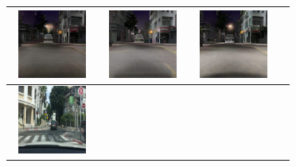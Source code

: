 \documentclass{VUMIFPSbakalaurinis}
\begin{document}
\begin{table}[H]
{\begin{tabular}{|c|c|c|c|}
            \includegraphics[width=100,height=85]{img/pvz/4_cycle} & \includegraphics[width=100,height=85]{img/pvz/4_cut} & \includegraphics[width=100,height=85]{img/pvz/4_mspc}
            \\
            \hline
            \includegraphics[width=100,height=85]{img/pvz/5_real} & 

\end{tabular}}
\end{table}
\end{document}
